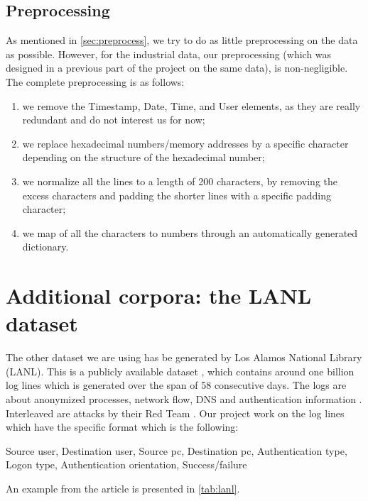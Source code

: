 \subsection{Preprocessing}
As mentioned in \autoref{sec:preprocess}, we try to do as little preprocessing on the data as possible. However, for the industrial data, our preprocessing (which was designed in a previous part of the project on the same data), is non-negligible.
\newpage
The complete preprocessing is as follows:
\begin{enumerate}
	\item we remove the Timestamp, Date, Time, and User elements, as they are really redundant and do not interest us for now;
	\item we replace hexadecimal numbers/memory addresses by a specific character depending on the structure of the hexadecimal number;
	\item we normalize all the lines to a length of 200 characters, by removing the excess characters and padding the shorter lines with a specific padding character;
	\item we map of all the characters to numbers through an automatically generated dictionary.
\end{enumerate}

\section{Additional corpora: the LANL dataset}
The other dataset we are using has be generated by Los Alamos National Library (LANL). This is a publicly available dataset \cite{lanl_source}, which contains around one billion log lines which is generated over the span of 58 consecutive days. The logs are about anonymized processes, network flow, DNS and authentication information \cite{rnn_attention_lanl}. Interleaved are attacks by their Red Team \cite{rnn_attention_lanl}.
Our project work on the log lines which have the specific format which is the following:

\begin{center}
Source user, Destination user, Source pc, Destination pc, Authentication type, Logon type, Authentication orientation, Success/failure
\end{center}

An example from the article \cite{rnn_attention_lanl} is presented in \autoref{tab:lanl}.

